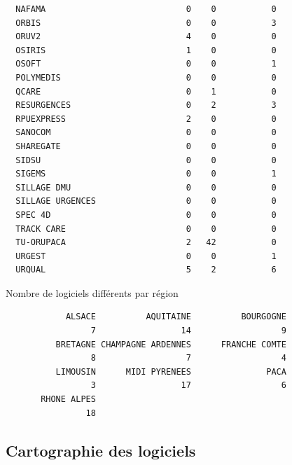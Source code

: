 \documentclass[]{article}
\begin{document}
\begin{verbatim}
  NAFAMA                            0    0           0
  ORBIS                             0    0           3
  ORUV2                             4    0           0
  OSIRIS                            1    0           0
  OSOFT                             0    0           1
  POLYMEDIS                         0    0           0
  QCARE                             0    1           0
  RESURGENCES                       0    2           3
  RPUEXPRESS                        2    0           0
  SANOCOM                           0    0           0
  SHAREGATE                         0    0           0
  SIDSU                             0    0           0
  SIGEMS                            0    0           1
  SILLAGE DMU                       0    0           0
  SILLAGE URGENCES                  0    0           0
  SPEC 4D                           0    0           0
  TRACK CARE                        0    0           0
  TU-ORUPACA                        2   42           0
  URGEST                            0    0           1
  URQUAL                            5    2           6
\end{verbatim}

Nombre de logiciels différents par région

\begin{verbatim}
            ALSACE          AQUITAINE          BOURGOGNE 
                 7                 14                  9 
          BRETAGNE CHAMPAGNE ARDENNES      FRANCHE COMTE 
                 8                  7                  4 
          LIMOUSIN      MIDI PYRENEES               PACA 
                 3                 17                  6 
       RHONE ALPES 
                18 
\end{verbatim}

\subsection{Cartographie des
logiciels}\label{cartographie-des-logiciels}
\end{document}
